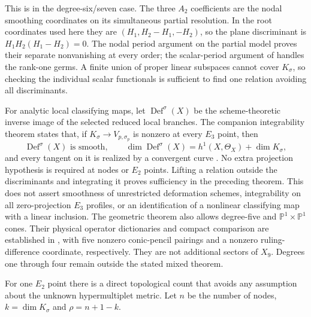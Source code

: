 This is \cite[Theorem~4.7]{Wuebben:2026smoothing} in the degree-six/seven
case. The three $A_2$ coefficients are the nodal smoothing coordinates
on its simultaneous partial resolution. In the root coordinates used
here they are $(H_1,H_2-H_1,-H_2)$, so the plane discriminant is
$H_1H_2(H_1-H_2)=0$. The nodal period argument on the partial model
proves their separate nonvanishing at every order; the scalar-period
argument of \cite{Wuebben:2026obstruction} handles the rank-one germs.
A finite union of proper linear subspaces cannot cover $K_\sigma$, so
checking the individual scalar functionals is sufficient to find one
relation avoiding all discriminants.

For analytic local classifying maps, let $\operatorname{Def}^{\sigma}(X)$
be the scheme-theoretic inverse image of the selected reduced local
branches. The companion integrability theorem states that, if
$K_\sigma\to V_{p,\sigma_p}$ is nonzero at every $E_3$ point, then
\begin{equation}
 \operatorname{Def}^{\sigma}(X)\text{ is smooth},\qquad
 \dim\operatorname{Def}^{\sigma}(X)=h^1(X,\Theta_X)+\dim K_\sigma,
 \label{eq:selected-base-dimension}
\end{equation}
and every tangent on it is realized by a convergent curve
\cite[Theorem~4.5]{Wuebben:2026smoothing}. No extra projection hypothesis
is required at nodes or $E_2$ points. Lifting a relation outside the
discriminants and integrating it proves sufficiency in the preceding
theorem. This does not assert smoothness of unrestricted deformation
schemes, integrability on all zero-projection $E_3$ profiles, or an
identification of a nonlinear classifying map with a linear inclusion.
The geometric theorem also allows degree-five and
$\mathbb P^1\times\mathbb P^1$ cones. Their physical operator
dictionaries and compact comparison are established in
\cite[Sections~2--4]{wuebben2026globalconstraints}, with five nonzero conic-pencil
pairings and a nonzero ruling-difference coordinate, respectively.
They are not additional sectors of $X_9$. Degrees one through four
remain outside the stated mixed theorem.

For one $E_2$ point there is a direct topological count that
avoids any assumption about the unknown hypermultiplet metric.
Let $n$ be the number of nodes, $k=\dim K_\sigma$ and
$\rho=n+1-k$.

